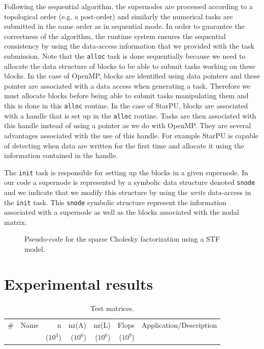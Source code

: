 \documentclass{article}
\newcommand{\starpu}{{StarPU}\xspace}
\newcommand{\openmp}{OpenMP\xspace}
\begin{document}
Following the sequential algorithm, the supernodes are processed
according to a topological order (e.g. a post-order) and similarly the
numerical tasks are submitted in the same order as in sequential
mode. In order to guarantee the correctness of the algorithm, the
runtime system ensures the sequential consistency by using the
data-access information that we provided with the task
submission. Note that the \texttt{alloc} task is done sequentially
because we need to allocate the data structure of blocks to be able to
submit tasks working on these blocks. In the case of \openmp, blocks
are identified using data pointers and these pointer are associated
with a data access when generating a task. Therefore we must allocate
blocks before being able to submit tasks manipulating them and this is
done in this \texttt{alloc} routine. In the case of \starpu, blocks
are associated with a handle that is set up in the \texttt{alloc}
routine. Tasks are then associated with this handle instead of using a
pointer as we do with \openmp. They are several advantages associated
with the use of this handle. For example \starpu is capable of
detecting when data are written for the first time and allocate it
using the information contained in the handle.

The \texttt{init} task is responsible for setting up the blocks in a
given supernode. In our code a supernode is represented by a symbolic
data structure denoted \texttt{snode} and we indicate that we modify
this structure by using the \textit{write} data-access in the
\texttt{init} task. This \texttt{snode} symbolic structure represent
the information associated with a supernode as well as the blocks
associated with the nodal matrix.

\begin{figure}[!h]
  \centering 
\caption{\label{fig:spllt-facto-pseudocode}Pseudo-code for the
  sparse Cholesky factorization using a STF model.}
\end{figure}

\section{Experimental results}\label{sec:experiments}

\begin{table}[htbp]

  \begin{center}
    \begin{tabular}{rl|rrrrl}
      \hline
      \# & Name & n        & nz(A)    & nz(L)    & Flops    & Application/Description \\
         &      & ($10^3$) & ($10^6$) & ($10^6$) & ($10^9$) &                         \\
      \hline
    \end{tabular}
\end{center}

  \caption{Test matrices.}
\end{table}
\end{document}
